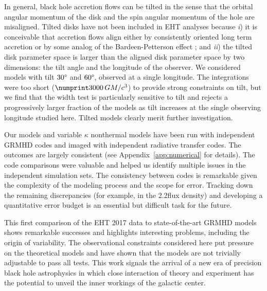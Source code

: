 In general, black hole accretion flows can be tilted in the sense that the orbital angular momentum of the disk and the spin angular momentum of the hole are misaligned.
Tilted disks have not been included in EHT analyses because
\emph{i}) it is conceivable that accretion flows align either by consistently oriented long term accretion or by some analog of the Bardeen-Petterson effect \citep{1975ApJ...195L..65B}; and
\emph{ii}) the tilted disk parameter space is larger than the aligned disk parameter space by two dimensions: the tilt angle and the longitude of the observer.
We considered models with tilt $30\degree$ and $60\degree$, observed at a single longitude.
The integrations were too short ($\no{3000}\,\tg$) to provide strong constraints on tilt, but we find that the \mring width test is particularly sensitive to tilt and rejects a progressively larger fraction of the models as tilt increases at the single observing longitude studied here.
Tilted models clearly merit further investigation.

Our \fiducial models and variable $\kappa$ nonthermal models have been run with independent GRMHD codes and imaged with independent radiative transfer codes.
The outcomes are largely consistent (see Appendix~\ref{app:numerical} for details).
The code comparisons were valuable and helped us identify multiple issues in the independent simulation sets.
The consistency between codes is remarkable given the complexity of the modeling process and the scope for error.
Tracking down the remaining discrepancies (for example, in the 2.2\um flux density) and developing a quantitative error budget is an essential but difficult task for the future.

This first comparison of the EHT 2017 \sgra data to state-of-the-art GRMHD models shows remarkable successes and highlights interesting problems, including the origin of variability.
The observational constraints considered here put pressure on the theoretical models and have shown that the models are not trivially adjustable to pass all tests.
This work signals the arrival of a new era of precision black hole astrophysics in which close interaction of theory and experiment has the potential to unveil the inner workings of the galactic center.
